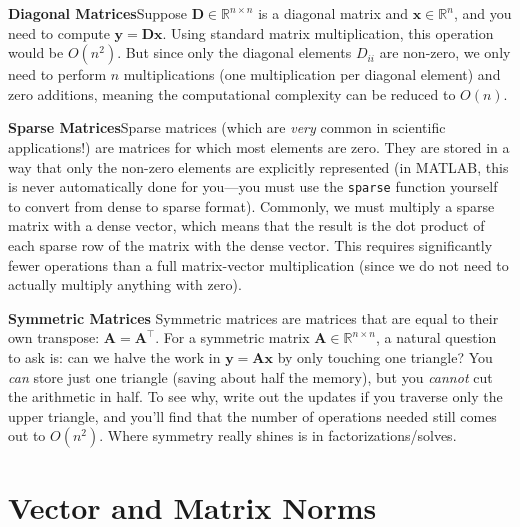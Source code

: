 \textbf{Diagonal Matrices}\quad Suppose $ \mathbf{D} \in \mathbb{R}^{n \times n} $ is a diagonal matrix and $\mathbf{x}\in \mathbb{R}^n$, and you need to compute $ \mathbf{y} = \mathbf{D}\mathbf{x} $. Using standard matrix multiplication, this operation would be $ O(n^2) $. But since only the diagonal elements $ D_{ii} $ are non-zero, we only need to perform $ n $ multiplications (one multiplication per diagonal element) and zero additions, meaning the computational complexity can be reduced to $ O(n) $.

\textbf{Sparse Matrices}\quad Sparse matrices (which are \textit{very} common in scientific applications!) are matrices for which most elements are zero. They are stored in a way that only the non-zero elements are explicitly represented (in MATLAB, this is never automatically done for you---you must use the \verb|sparse| function yourself to convert from dense to sparse format). Commonly, we must multiply a sparse matrix with a dense vector, which means that the result is the dot product of each sparse row of the matrix with the dense vector. This requires significantly fewer operations than a full matrix-vector multiplication (since we do not need to actually multiply anything with zero).

\textbf{Symmetric Matrices}\quad
Symmetric matrices are matrices that are equal to their own transpose: $ \mathbf{A} = \mathbf{A}^\top $. For a symmetric matrix $ \mathbf{A} \in \mathbb{R}^{n\times n} $, a natural question to ask is: can we halve the work in $\mathbf{y}=\mathbf{A}\mathbf{x}$ by only touching one triangle?  You \emph{can} store just one triangle (saving about half the memory), but you \emph{cannot} cut the arithmetic in half. To see why, write out the updates if you traverse only the upper triangle, and you'll find that the number of operations needed still comes out to $O(n^2)$. Where symmetry really shines is in factorizations/solves.


\section{Vector and Matrix Norms}

